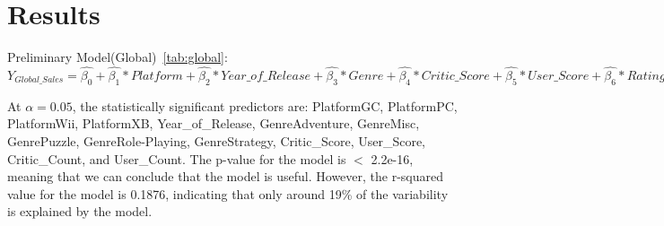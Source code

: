 \documentclass[12pt]{article}
\begin{document}
\section{Results}
\label{sec:resu}
Preliminary Model(Global)~\ref{tab:global}:
$Y_{Global\_Sales}=\hat{\beta_{0}}+\hat{\beta_{1}}*Platform+\hat{\beta_{2}}*Year\_of\_Release+\hat{\beta_{3}}*Genre+\hat{\beta_{4}}*Critic\_Score+\hat{\beta_{5}}*User\_Score+\hat{\beta_{6}}*Rating+\hat{\beta_{7}}*Critic\_Count+\hat{\beta_{8}}*Critic\_Count$

At $\alpha=0.05$, the statistically significant predictors are: PlatformGC, PlatformPC, PlatformWii, PlatformXB, Year\_of\_Release, 
GenreAdventure, GenreMisc, GenrePuzzle, GenreRole-Playing, GenreStrategy, Critic\_Score, User\_Score, Critic\_Count, and User\_Count. 
The p-value for the model is $<$ 2.2e-16, meaning that we can conclude that the model is useful. However, the r-squared value for the model is 0.1876,
indicating that only around 19\% of the variability is explained by the model.
\end{document}
